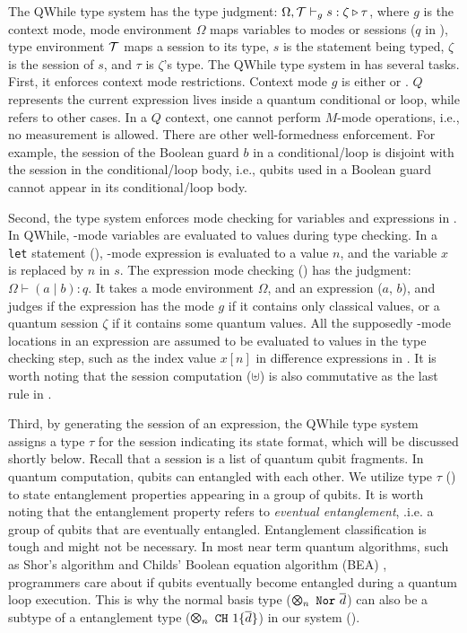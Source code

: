 The QWhile type system has the type judgment: $\Omega,\mathcal{T}\vdash_g s : \zeta\triangleright \tau$, where $g$ is the context mode, mode environment $\Omega$ maps variables to modes or sessions ($q$ in ), type environment $\mathcal{T}$ maps a session to its type, $s$ is the statement being typed, $\zeta$ is the session of $s$, and $\tau$ is $\zeta$'s type. 
The QWhile type system in  has several tasks. First, it enforces context mode restrictions.
Context mode $g$ is either \cmode or \qmode.
$Q$ represents the current expression lives inside a quantum conditional or loop, while \cmode refers to other cases.
In a $Q$ context, one cannot perform $M$-mode operations, i.e., no measurement is allowed.
There are other well-formedness enforcement. For example,
the session of the Boolean guard $b$ in a conditional/loop is disjoint with the session in the conditional/loop body,
i.e., qubits used in a Boolean guard cannot appear in its conditional/loop body.

Second, the type system enforces mode checking for variables and expressions in .
In QWhile, \cmode-mode variables are evaluated to values during type checking.
In a \texttt{let} statement (),
\cmode-mode expression is evaluated to a value $n$, and the variable $x$ is replaced by $n$ in $s$.
The expression mode checking () has the judgment: $\Omega \vdash (a\mid b) : q$. It takes a mode environment $\Omega$, and an expression ($a$, $b$), and judges if the expression has the mode $g$ if it contains only classical values, or a quantum session $\zeta$ if it contains some quantum values. 
All the supposedly \cmode-mode locations in an expression are assumed
to be evaluated to values in the type checking step,
such as the index value $x[n]$ in difference expressions in .
It is worth noting that the session computation ($\uplus$)
is also commutative as the last rule in .

Third, by generating the session of an expression, the QWhile type system assigns a type $\tau$ for the session indicating its state format, which will be discussed shortly below. Recall that a session is a list of quantum qubit fragments.
In quantum computation, qubits can entangled with each other.
We utilize type $\tau$ () to state entanglement properties appearing in a group of qubits.
It is worth noting that the entanglement property refers to \textit{eventual entanglement}, .i.e. a group of qubits that are eventually entangled. Entanglement classification is tough and might not be necessary. In most near term quantum algorithms, such as Shor's algorithm \cite{shors} and Childs' Boolean equation algorithm (BEA) \cite{ChildsNAND}, programmers care about if qubits eventually become entangled during a quantum loop execution. This is why the normal basis type ($\ttype{n}{\tnor{\overline{d}}}$) can also be a subtype of a entanglement type ($\ttype{n}{\tch{1}{\{\overline{d}\}}}$) in our system ().

